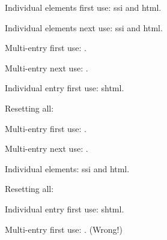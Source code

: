 \documentclass[12pt]{article}
\begin{document}
Individual elements first use: \gls{ssi} and \gls{html}.


Individual elements next use: \gls{ssi} and \gls{html}.


Multi-entry first use: .


Multi-entry next use: .


Individual entry first use: \gls{shtml}.


Resetting all\glsresetall\mglsresetall:


Multi-entry first use: .


Multi-entry next use: .


Individual elements: \gls{ssi} and \gls{html}.


Resetting all\glsresetall\mglsresetall:


Individual entry first use: \gls{shtml}.


Multi-entry first use: . (Wrong!)


\printglossaries 
\end{document}
